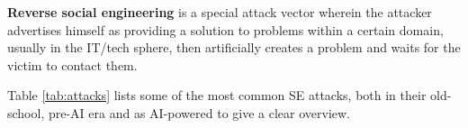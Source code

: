 


\textbf{Reverse social engineering} is a special attack vector wherein the attacker advertises himself as providing a solution to problems within a certain domain, usually in the IT/tech sphere, then artificially creates a problem and waits for the victim to contact them.



    
Table \ref{tab:attacks} lists some of the most common SE attacks, both in their old-school, pre-AI era and as AI-powered to give a clear overview.

